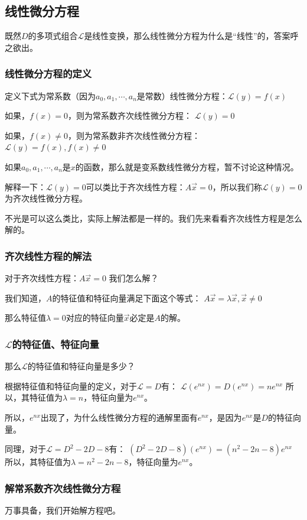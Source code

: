 \documentclass[12pt]{article}
\begin{document}
\subsection{线性微分方程}
既然$D$的多项式组合$\mathcal{L}$是线性变换，那么线性微分方程为什么是“线性”的，答案呼之欲出。

\subsubsection{线性微分方程的定义}
定义下式为常系数（因为$a_0,a_1,\cdots,a_n$是常数）线性微分方程：$\mathcal L(y)=f(x)$

如果，$f(x)=0$，则为常系数齐次线性微分方程：
$\mathcal L(y)=0$

如果，$f(x)\ne0$，则为常系数非齐次线性微分方程：
$\mathcal L(y)=f(x),f(x)\ne0$

如果$a_0,a_1,\cdots,a_n$是$x$的函数，那么就是变系数线性微分方程，暂不讨论这种情况。

解释一下：$\mathcal{L}(y)=0$可以类比于齐次线性方程：$A\vec{x_{}}=0$，所以我们称$\mathcal{L}(y)=0$为齐次线性微分方程。

不光是可以这么类比，实际上解法都是一样的。我们先来看看齐次线性方程是怎么解的。

\subsubsection{齐次线性方程的解法}
对于齐次线性方程：$A\vec{x_{}}=0$
我们怎么解？

我们知道，$A$的特征值和特征向量满足下面这个等式：
$A\vec{x_{}}=\lambda\vec{x_{}},\vec{x}\ne 0$


那么特征值$\lambda=0$对应的特征向量$\vec{x_{}}$必定是$A$的解。

\subsubsection{$\mathcal{L}$的特征值、特征向量}
那么$\mathcal{L}$的特征值和特征向量是多少？

根据特征值和特征向量的定义，对于$\mathcal{L}=D$有：
$\mathcal{L}(e^{nx})=D(e^{nx})=ne^{nx}$
所以，其特征值为$\lambda=n$，特征向量为$e^{nx}$。

所以，$e^{nx}$出现了，为什么线性微分方程的通解里面有$e^{nx}$，是因为$e^{nx}$是$D$的特征向量。

同理，对于$\mathcal{L}=D^2-2D-8$有：
$(D^2-2D-8)(e^{nx})=(n^2-2n-8)e^{nx}$
所以，其特征值为$\lambda=n^2-2n-8$，特征向量为$e^{nx}$。

\subsubsection{解常系数齐次线性微分方程}
万事具备，我们开始解方程吧。
\end{document}
